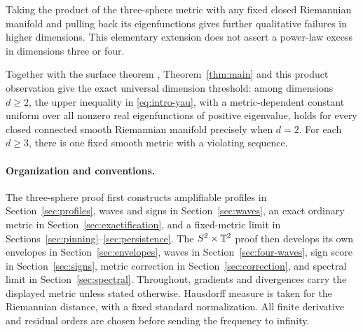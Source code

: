 Taking the product of the three-sphere metric with any fixed closed
Riemannian manifold and pulling back its eigenfunctions gives further
qualitative failures in higher dimensions. This elementary extension
does not assert a power-law excess in dimensions three or four.

Together with the surface theorem \cite[Theorem~1.1]{OpenAINodalSurfaces2026},
Theorem~\ref{thm:main} and this product observation give the exact universal
dimension threshold: among dimensions $d\ge2$, the upper inequality in
\eqref{eq:intro-yau}, with a metric-dependent constant uniform over all
nonzero real eigenfunctions of positive eigenvalue, holds for every closed
connected smooth Riemannian manifold precisely when $d=2$. For each
$d\ge3$, there is one fixed smooth metric with a violating sequence.

\paragraph{Organization and conventions.}
The three-sphere proof first constructs amplifiable profiles in
Section~\ref{sec:profiles}, waves and signs in Section~\ref{sec:waves},
an exact ordinary metric in Section~\ref{sec:exactification}, and a
fixed-metric limit in Sections~\ref{sec:pinning}--\ref{sec:persistence}.
The $S^2\times\mathbb T^2$ proof then develops its own envelopes in
Section~\ref{sec:envelopes}, waves in Section~\ref{sec:four-waves},
sign score in Section~\ref{sec:signs}, metric correction in
Section~\ref{sec:correction}, and spectral limit in
Section~\ref{sec:spectral}. Throughout, gradients and divergences
carry the displayed metric unless stated otherwise. Hausdorff measure
is taken for the Riemannian distance, with a fixed standard
normalization. All finite derivative and residual orders are chosen
before sending the frequency to infinity.
